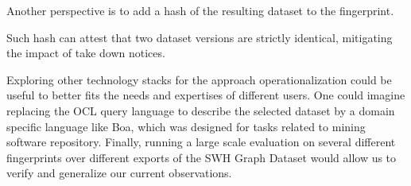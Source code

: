 Another perspective is to add a hash of the resulting dataset to the fingerprint.

Such hash can attest that two dataset versions are strictly identical, mitigating the impact of take down notices.

Exploring other technology stacks for the approach operationalization could be useful to better fits the needs and expertises of different users.
One could imagine replacing the OCL query language to describe the selected dataset by a domain specific language like Boa, which was designed for tasks related to mining software repository. Finally, running a large scale evaluation on several different fingerprints over different exports of the SWH Graph Dataset would allow us to verify and generalize our current observations.